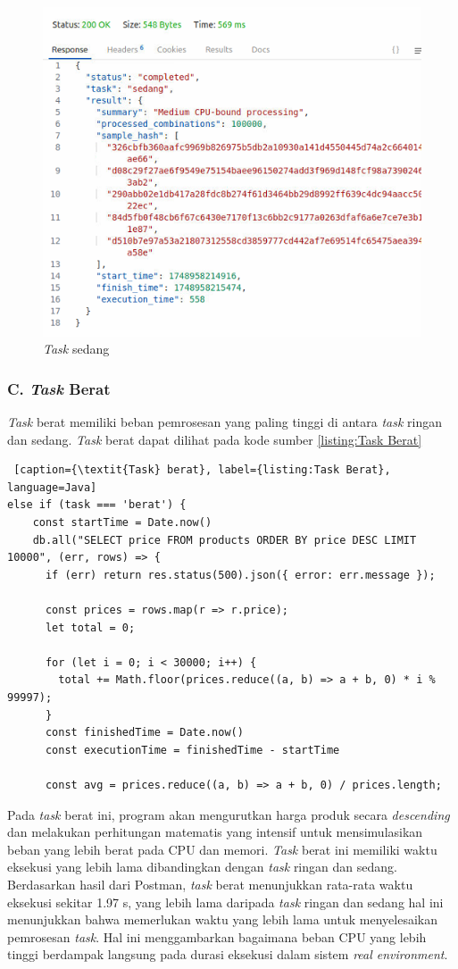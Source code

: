 \begin{figure} [H]
    \centering
    \includegraphics[width=0.75\linewidth]{gambar/Task Sedang.png}
    \caption{\textit{Task} sedang}
    \label{figure:Task Sedang}
\end{figure}

\subsubsection{C. \textit{Task} Berat}
\textit{Task} berat memiliki beban pemrosesan yang paling tinggi di antara \textit{task} ringan dan sedang. \textit{Task} berat dapat dilihat pada kode sumber \ref{listing:Task Berat}

\begin{lstlisting} [caption={\textit{Task} berat}, label={listing:Task Berat}, language=Java]
else if (task === 'berat') {
    const startTime = Date.now()
    db.all("SELECT price FROM products ORDER BY price DESC LIMIT 10000", (err, rows) => {
      if (err) return res.status(500).json({ error: err.message });

      const prices = rows.map(r => r.price);
      let total = 0;

      for (let i = 0; i < 30000; i++) {
        total += Math.floor(prices.reduce((a, b) => a + b, 0) * i % 99997);
      }
      const finishedTime = Date.now()
      const executionTime = finishedTime - startTime

      const avg = prices.reduce((a, b) => a + b, 0) / prices.length;
\end{lstlisting}

Pada \textit{task} berat ini, program akan mengurutkan harga produk secara \textit{descending} dan melakukan perhitungan matematis yang intensif untuk mensimulasikan beban yang lebih berat pada CPU dan memori. \textit{Task} berat ini memiliki waktu eksekusi yang lebih lama dibandingkan dengan \textit{task} ringan dan sedang. Berdasarkan hasil dari Postman, \textit{task} berat menunjukkan rata-rata waktu eksekusi sekitar 1.97 s, yang lebih lama daripada \textit{task} ringan dan sedang hal ini menunjukkan bahwa memerlukan waktu yang lebih lama untuk menyelesaikan pemrosesan \textit{task}. Hal ini menggambarkan bagaimana beban CPU yang lebih tinggi berdampak langsung pada durasi eksekusi dalam sistem \textit{real environment}.


